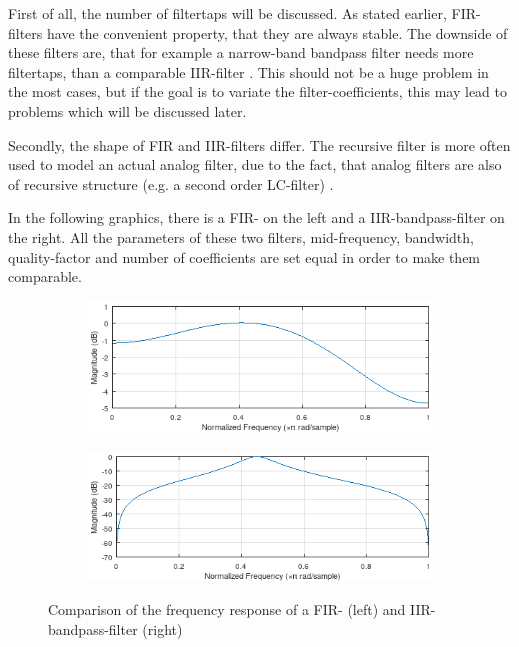 First of all, the number of filtertaps will be discussed. As stated earlier, \ac{FIR}-filters have
the convenient property, that they are always stable. The downside of these filters are,
that for example a narrow-band bandpass filter needs more filtertaps, than a comparable
\ac{IIR}-filter \cite{meyer_signalverarbeitung}. This should not be a huge problem in the most cases,
but if the goal is to variate the filter-coefficients, this may lead to problems which will be discussed
later.

Secondly, the shape of \ac{FIR} and \ac{IIR}-filters differ. The recursive filter is more often used to
model an actual analog filter, due to the fact, that analog filters are also of recursive structure (e.g.
a second order LC-filter) \cite{meyer_signalverarbeitung}.

In the following graphics, there is a \ac{FIR}- on the left and a \ac{IIR}-bandpass-filter on the right.
All the parameters of these two filters, mid-frequency, bandwidth, quality-factor and number of coefficients
are set equal in order to make them comparable.

\begin{figure}[!h]
    \centering
    \begin{subfigure}[c]{0.45\textwidth}
        \centering
        \includegraphics[width=\textwidth]{img/fir_bandpass.png}
    \end{subfigure}
    \begin{subfigure}[c]{0.45\textwidth}
        \centering
        \includegraphics[width=\textwidth]{img/iir_bandpass.png}
    \end{subfigure}
    \caption{Comparison of the frequency response of a \ac{FIR}- (left) and \ac{IIR}-bandpass-filter (right)}
    \label{fig:fir-iir-compare}
\end{figure}


